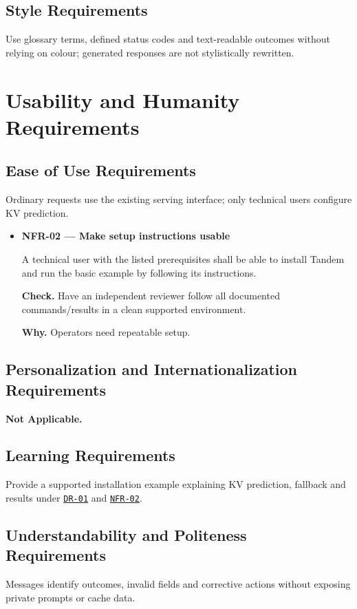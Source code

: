 \documentclass[12pt]{article}
\begin{document}
\subsection{Style Requirements}
Use glossary terms, defined status codes and text-readable outcomes without
relying on colour; generated responses are not stylistically rewritten.


\section{Usability and Humanity Requirements}


\subsection{Ease of Use Requirements}
Ordinary requests use the existing serving interface; only technical users configure KV prediction.

\begin{itemize}
\item {}\label{req:NFR-02}
\textbf{NFR-02 --- Make setup instructions usable}\par
A technical user with the listed prerequisites shall be able to install Tandem and run the basic example by following its instructions.\par
\textbf{Check.} Have an independent reviewer follow all documented commands/results in a clean supported environment.\par
\textbf{Why.} Operators need repeatable setup.
\end{itemize}

\subsection{Personalization and Internationalization Requirements}
\textbf{Not Applicable.}


\subsection{Learning Requirements}
Provide a supported installation example explaining KV prediction, fallback
and results under \hyperref[req:DR-01]{\texttt{DR-01}} and
\hyperref[req:NFR-02]{\texttt{NFR-02}}.


\subsection{Understandability and Politeness Requirements}
Messages identify outcomes, invalid fields and corrective actions without exposing private prompts or cache data.
\end{document}
